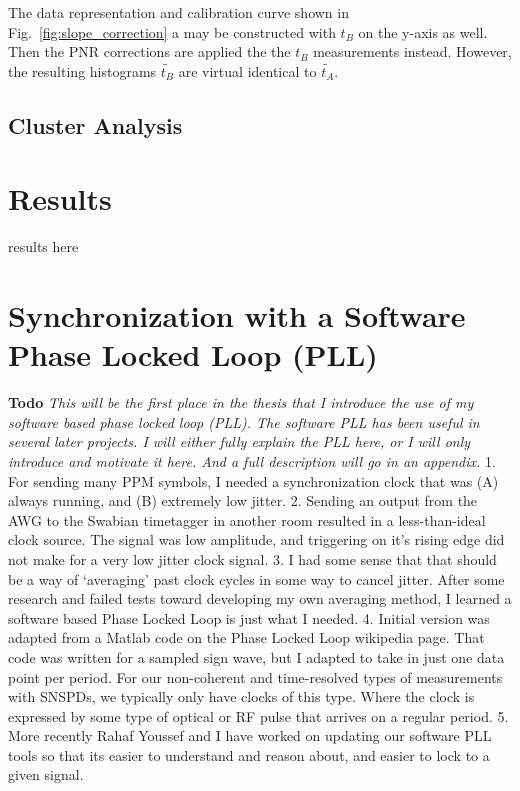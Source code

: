 \documentclass[11pt]{caltech_thesis} %
\begin{document}
The data representation and calibration curve shown in
Fig.~\ref{fig:slope_correction} a may be constructed with $t_B$ on the
y-axis as well. Then the PNR corrections are applied the the $t_B$
measurements instead. However, the resulting histograms $\tilde{t_B}$
are virtual identical to $\tilde{t_A}$.

\hypertarget{cluster-analysis}{%
\subsection{Cluster Analysis}\label{cluster-analysis}}

\hypertarget{results}{%
\section{Results}\label{results}}

results here

{}

\hypertarget{synchronization-with-a-software-phase-locked-loop-pll}{%
\section{Synchronization with a Software Phase Locked Loop
(PLL)}\label{synchronization-with-a-software-phase-locked-loop-pll}}

\textbf{Todo} \emph{This will be the first place in the thesis that I
introduce the use of my software based phase locked loop (PLL). The
software PLL has been useful in several later projects. I will either
fully explain the PLL here, or I will only introduce and motivate it
here. And a full description will go in an appendix. } 1. For sending
many PPM symbols, I needed a synchronization clock that was (A) always
running, and (B) extremely low jitter. 2. Sending an output from the AWG
to the Swabian timetagger in another room resulted in a less-than-ideal
clock source. The signal was low amplitude, and triggering on it's
rising edge did not make for a very low jitter clock signal. 3. I had
some sense that that should be a way of `averaging' past clock cycles in
some way to cancel jitter. After some research and failed tests toward
developing my own averaging method, I learned a software based Phase
Locked Loop is just what I needed. 4. Initial version was adapted from a
Matlab code on the Phase Locked Loop wikipedia page. That code was
written for a sampled sign wave, but I adapted to take in just one data
point per period. For our non-coherent and time-resolved types of
measurements with SNSPDs, we typically only have clocks of this type.
Where the clock is expressed by some type of optical or RF pulse that
arrives on a regular period. 5. More recently Rahaf Youssef and I have
worked on updating our software PLL tools so that its easier to
understand and reason about, and easier to lock to a given signal.
\end{document}

